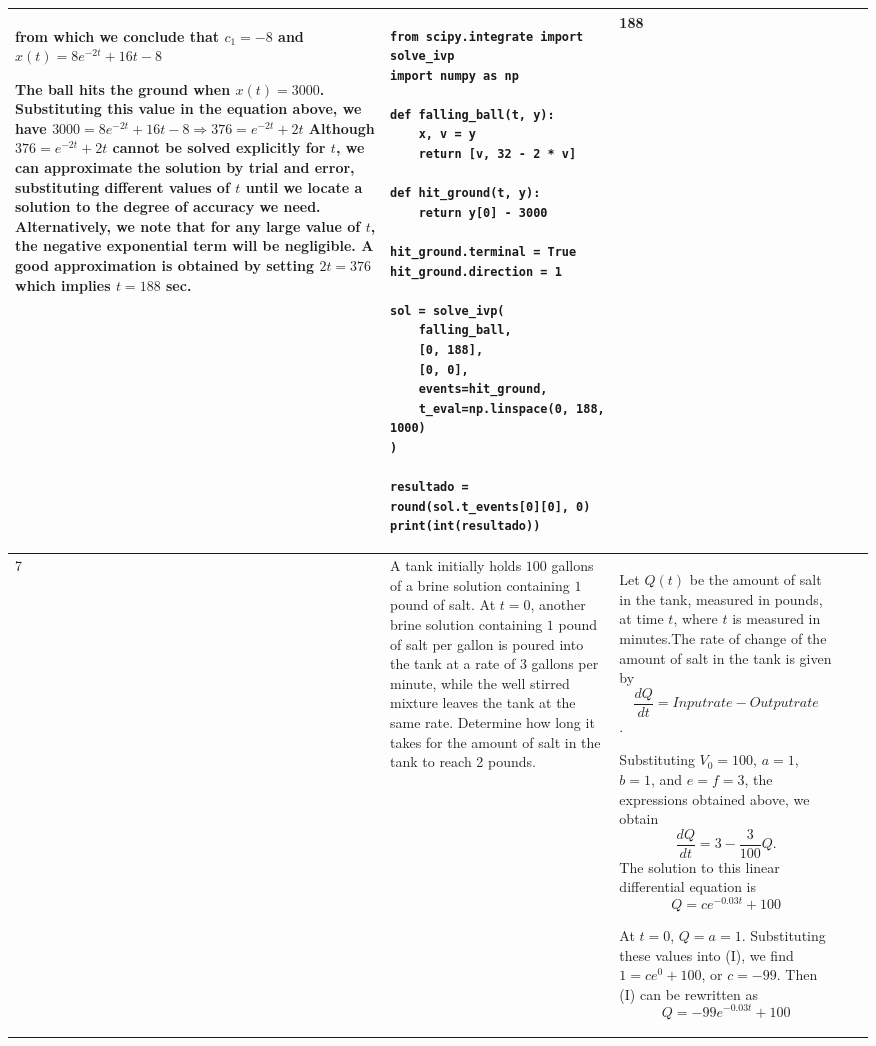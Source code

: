 \documentclass[a4paper,12pt]{article}
\begin{document}
\begin{longtable}{|p{0.3cm}|p{}|p{10cm}|p{}|p{1.5cm}|}
from which we conclude that \( c_1 = -8 \) and $x(t) = 8e^{-2t} + 16t - 8$

The ball hits the ground when \( x(t) = 3000 \). Substituting this value in the equation above, we have
$3000 = 8e^{-2t} + 16t - 8 \Rightarrow 376 = e^{-2t} + 2t $
Although $ 376 = e^{-2t} + 2t$ cannot be solved explicitly for \( t \), we can approximate the solution by trial and error, substituting different values of \( t \)  until we locate a solution to the degree of accuracy we need. Alternatively, we note that for any large value of \( t \), the negative exponential term will be negligible. A good approximation is obtained by setting $ 2t = 376$ which implies $t = 188$ sec. 
          &
\begin{verbatim}
from scipy.integrate import solve_ivp
import numpy as np

def falling_ball(t, y):
    x, v = y
    return [v, 32 - 2 * v]

def hit_ground(t, y):
    return y[0] - 3000

hit_ground.terminal = True
hit_ground.direction = 1

sol = solve_ivp(
    falling_ball,
    [0, 188],
    [0, 0],
    events=hit_ground,
    t_eval=np.linspace(0, 188, 1000)
)

resultado = round(sol.t_events[0][0], 0)
print(int(resultado))
\end{verbatim}&     188          \\ \hline
      7 & A tank initially holds $100$ gallons of a brine solution containing $1$ pound of salt. At $t = 0$, another brine solution containing $1$ pound of salt per gallon is poured into the tank at a rate of $3$ gallons per minute, while the well stirred mixture leaves the tank at the same rate. Determine how long it takes for the amount of salt in the tank to reach 2 pounds.               &Let $Q(t)$ be the amount of salt in the tank, measured in pounds, at time $t$, where $t$ is measured in minutes.The rate of change of the amount of salt in the tank is given by
\[\frac{dQ}{dt} = Input rate - Output rate \].


Substituting \( V_0 = 100 \), \( a = 1 \), \( b = 1 \), and \( e = f = 3 \), the expressions obtained above, we obtain
\[
\frac{dQ}{dt} = 3 - \frac{3}{100} Q.
\]
The solution to this linear differential equation is  
\[
Q = ce^{-0.03t} + 100
\]

At \( t = 0 \), \( Q = a = 1 \). Substituting these values into (I), we find \( 1 = ce^0 + 100 \), or \( c = -99 \). Then (I) can be rewritten as  
\[
Q = -99e^{-0.03t} + 100 \]


\end{longtable}
\end{document}

